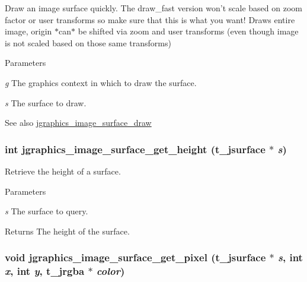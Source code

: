 Draw an image surface quickly. The draw\_\-fast version won't scale based on zoom factor or user transforms so make sure that this is what you want! Draws entire image, origin $\ast$can$\ast$ be shifted via zoom and user transforms (even though image is not scaled based on those same transforms)


\begin{DoxyParams}{Parameters}
\item[{\em g}]The graphics context in which to draw the surface. \item[{\em s}]The surface to draw. \end{DoxyParams}
\begin{DoxySeeAlso}{See also}
\hyperlink{group__jsurface_gab6b97ae8202c210ccec29ec2b8c4f5d0}{jgraphics\_\-image\_\-surface\_\-draw} 
\end{DoxySeeAlso}
\hypertarget{group__jsurface_ga5eac45fcd4dd046cb330ddea899cdca5}{
\subsubsection[{jgraphics\_\-image\_\-surface\_\-get\_\-height}]{\setlength{\rightskip}{0pt plus 5cm}int jgraphics\_\-image\_\-surface\_\-get\_\-height ({\bf t\_\-jsurface} $\ast$ {\em s})}}
\label{group__jsurface_ga5eac45fcd4dd046cb330ddea899cdca5}


Retrieve the height of a surface. 
\begin{DoxyParams}{Parameters}
\item[{\em s}]The surface to query. \end{DoxyParams}
\begin{DoxyReturn}{Returns}
The height of the surface. 
\end{DoxyReturn}
\hypertarget{group__jsurface_gad4ad8d34eb21640502f64e727d894cf4}{
\subsubsection[{jgraphics\_\-image\_\-surface\_\-get\_\-pixel}]{\setlength{\rightskip}{0pt plus 5cm}void jgraphics\_\-image\_\-surface\_\-get\_\-pixel ({\bf t\_\-jsurface} $\ast$ {\em s}, \/  int {\em x}, \/  int {\em y}, \/  {\bf t\_\-jrgba} $\ast$ {\em color})}}
\label{group__jsurface_gad4ad8d34eb21640502f64e727d894cf4}


